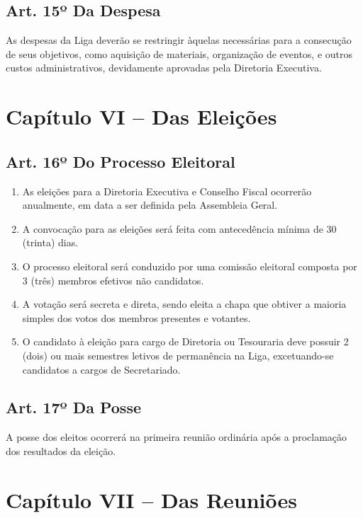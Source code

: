 \documentclass[12pt, a4paper]{article}
\begin{document}
\subsection{Art. 15º Da Despesa}
As despesas da Liga deverão se restringir àquelas necessárias para a consecução de seus objetivos, como aquisição de materiais, organização de eventos, e outros custos administrativos, devidamente aprovadas pela Diretoria Executiva.


\section{Capítulo VI – Das Eleições}


\subsection{Art. 16º Do Processo Eleitoral}
\begin{enumerate}[label=\S \arabic*.]
    \item As eleições para a Diretoria Executiva e Conselho Fiscal ocorrerão anualmente, em data a ser definida pela Assembleia Geral.
    \item A convocação para as eleições será feita com antecedência mínima de 30 (trinta) dias.
    \item O processo eleitoral será conduzido por uma comissão eleitoral composta por 3 (três) membros efetivos não candidatos.
    \item A votação será secreta e direta, sendo eleita a chapa que obtiver a maioria simples dos votos dos membros presentes e votantes.
    \item O candidato à eleição para cargo de Diretoria ou Tesouraria deve possuir 2 (dois) ou mais semestres letivos de permanência na Liga, excetuando-se candidatos a cargos de Secretariado.
\end{enumerate}

\subsection{Art. 17º Da Posse}
A posse dos eleitos ocorrerá na primeira reunião ordinária após a proclamação dos resultados da eleição.


\section{Capítulo VII – Das Reuniões}
\end{document}

